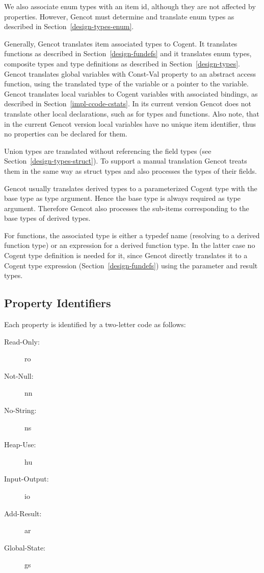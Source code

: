 We also associate enum types with an item id, although they are not affected by properties. However, Gencot must determine 
and translate enum types as described in Section~\ref{design-types-enum}.

Generally, Gencot translates item associated types to Cogent. It translates functions as described in Section~\ref{design-fundefs}
and it translates enum types, composite types and type definitions as described in Section~\ref{design-types}.
Gencot translates global variables with Const-Val property to an abstract access function, using the translated 
type of the variable or a pointer to the variable.
Gencot translates local variables to Cogent variables with associated bindings, as described in Section~\ref{impl-ccode-cstats}.
In its current version Gencot does not translate other local declarations, such as for types and functions.
Also note, that in the current Gencot version local variables have no unique item identifier, thus no properties
can be declared for them.

Union types are translated without referencing the field types
(see Section~\ref{design-types-struct}). To support a manual translation Gencot treats them in 
the same way as struct types and also processes the types of their fields.

Gencot usually translates derived types to a parameterized Cogent type with the base type as type argument. Hence the base
type is always required as type argument. Therefore Gencot also processes the sub-items corresponding to the base types 
of derived types.

For functions, the associated type is either a typedef name (resolving to a derived function type) 
or an expression for a derived function type. In the latter case no Cogent type definition is needed for it, since Gencot
directly translates it to a Cogent type expression (Section~\ref{design-fundefs}) using the parameter and result types. 

\subsection{Property Identifiers}
\label{impl-itemprops-property}

Each property is identified by a two-letter code as follows:
\begin{description}
\item[Read-Only:] ro
\item[Not-Null:] nn
\item[No-String:] ns
\item[Heap-Use:] hu
\item[Input-Output:] io
\item[Add-Result:] ar
\item[Global-State:] gs
\end{description}

